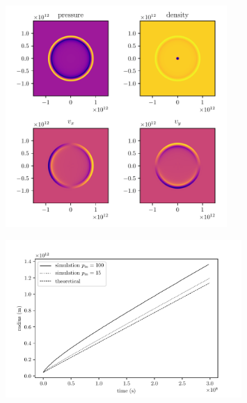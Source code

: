 \documentclass{beamer}
\begin{document}
\begin{frame}
	\begin{figure}[h]
		\centering
		\includegraphics[width=0.75\textwidth]{figures/output.pdf}
	\end{figure}	
\end{frame}
\begin{frame}
	\begin{figure}[h]
		\centering
		\includegraphics[width=0.8\textwidth]{figures/non_linear_effects.pdf}
	\end{figure}
\end{frame}
\end{document}
